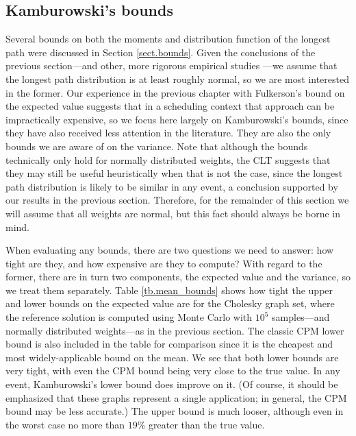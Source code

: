 \documentclass[12pt]{article}
\begin{document}
\subsection{Kamburowski's bounds}
\label{subsect.results_kamb}

Several bounds on both the moments and distribution function of the longest path were discussed in Section \ref{sect.bounds}. Given the conclusions of the previous section---and other, more rigorous empirical studies \cite{can16,lud01}---we assume that the longest path distribution is at least roughly normal, so we are most interested in the former. Our experience in the previous chapter with Fulkerson's bound on the expected value suggests that in a scheduling context that approach can be impractically expensive, so we focus here largely on Kamburowski's bounds, since they have also received less attention in the literature. They are also the only bounds we are aware of on the variance. Note that although the bounds technically only hold for normally distributed weights, the CLT suggests that they may still be useful heuristically when that is not the case, since the longest path distribution is likely to be similar in any event, a conclusion supported by our results in the previous section. Therefore, for the remainder of this section we will assume that all weights are normal, but this fact should always be borne in mind.

When evaluating any bounds, there are two questions we need to answer: how tight are they, and how expensive are they to compute? With regard to the former, there are in turn two components, the expected value and the variance, so we treat them separately. Table \ref{tb.mean_bounds} shows how tight the upper and lower bounds on the expected value are for the Cholesky graph set, where the reference solution is computed using Monte Carlo with $10^5$ samples---and normally distributed weights---as in the previous section. The classic CPM lower bound is also included in the table for comparison since it is the cheapest and most widely-applicable bound on the mean. We see that both lower bounds are very tight, with even the CPM bound being very close to the true value. In any event, Kamburowski's lower bound does improve on it. (Of course, it should be emphasized that these graphs represent a single application; in general, the CPM bound may be less accurate.) The upper bound is much looser, although even in the worst case no more than $19\%$ greater than the true value.  
\end{document}
